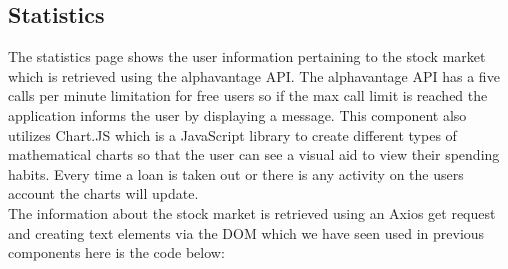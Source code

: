 \subsection{Statistics}
The statistics page shows the user information pertaining to the stock market which is retrieved using the
alphavantage API.  The alphavantage API has a five calls per minute limitation for free users so if the
max call limit is reached the application informs the user by displaying a message.  This component also utilizes
Chart.JS which is a JavaScript library to create different types of mathematical charts so that the user can
see a visual aid to view their spending habits.  Every time a loan is taken out or there is any activity on the users
account the charts will update.
\\
The information about the stock market is retrieved using an Axios get request and creating text elements via the DOM which we
have seen used in previous components here is the code below:
